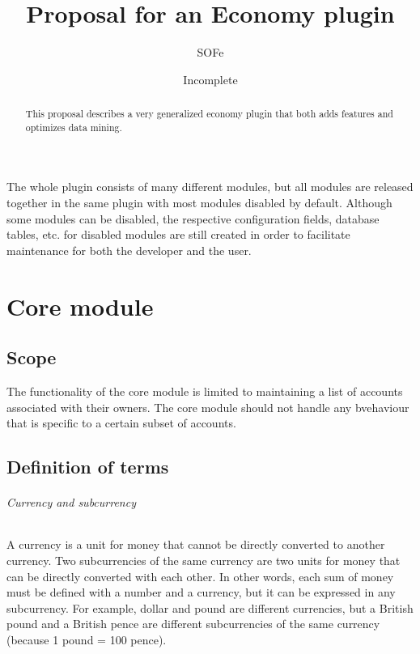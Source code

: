 \documentclass{report}
\title{Proposal for an Economy plugin}
\date{Incomplete}
\author{SOFe}
\begin{document}

	\maketitle
	\tableofcontents

	\begin{abstract}
		This proposal describes a very generalized economy plugin that both adds features and optimizes data mining.
	\end{abstract}

	The whole plugin consists of many different modules, but all modules are released together in the same plugin with most modules disabled by default.
	Although some modules can be disabled, the respective configuration fields, database tables, etc. for disabled modules
	are still created in order to facilitate maintenance for both the developer and the user.

	\part{Core module}
		\chapter{Scope}
			The functionality of the core module is limited to maintaining a list of accounts associated with their owners.
			The core module should not handle any bvehaviour that is specific to a certain subset of accounts.

		\chapter{Definition of terms}
			\paragraph{Currency and subcurrency}
				A currency is a unit for money that cannot be directly converted to another currency.
				Two subcurrencies of the same currency are two units for money that can be directly converted with each other.
				In other words, each sum of money must be defined with a number and a currency, but it can be expressed in any subcurrency.
				For example, dollar and pound are different currencies, but a British pound and a British pence are different subcurrencies of the same currency
				(because 1 pound = 100 pence).
\end{document}
